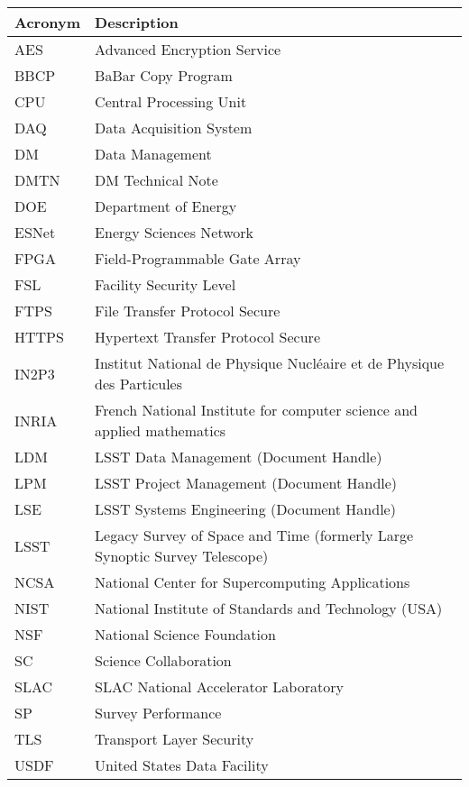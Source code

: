 \addtocounter{table}{-1}
\begin{longtable}{p{}p{}}\hline
\textbf{Acronym} & \textbf{Description}  \\\hline

AES & Advanced Encryption Service \\\hline
BBCP & BaBar Copy Program \\\hline
CPU & Central Processing Unit \\\hline
DAQ & Data Acquisition System \\\hline
DM & Data Management \\\hline
DMTN & DM Technical Note \\\hline
DOE & Department of Energy \\\hline
ESNet & Energy Sciences Network \\\hline
FPGA & Field-Programmable Gate Array \\\hline
FSL & Facility Security Level \\\hline
FTPS & File Transfer Protocol Secure \\\hline
HTTPS & Hypertext Transfer Protocol Secure \\\hline
IN2P3 & Institut National de Physique Nucléaire et de Physique des Particules \\\hline
INRIA & French National Institute for computer science and applied mathematics \\\hline
LDM & LSST Data Management (Document Handle) \\\hline
LPM & LSST Project Management (Document Handle) \\\hline
LSE & LSST Systems Engineering (Document Handle) \\\hline
LSST & Legacy Survey of Space and Time (formerly Large Synoptic Survey Telescope) \\\hline
NCSA & National Center for Supercomputing Applications \\\hline
NIST & National Institute of Standards and Technology (USA) \\\hline
NSF & National Science Foundation \\\hline
SC & Science Collaboration \\\hline
SLAC & SLAC National Accelerator Laboratory \\\hline
SP & Survey Performance \\\hline
TLS & Transport Layer Security \\\hline
USDF & United States Data Facility \\\hline
\end{longtable}

